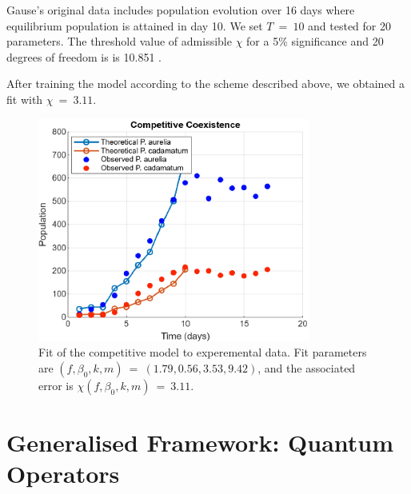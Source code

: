 \documentclass[11pt,reqno]{amsart}
\numberwithin{equation}{section}
\theoremstyle{plain}
\begin{document}
\vspace{2mm}

Gause's original data includes population evolution over 16 days where equilibrium population is attained in day 10. We set $T \ = \  10$ and tested for 20 parameters. The threshold value of admissible $\chi$ for a 5\% significance and 20 degrees of freedom is 
is 10.851 \cite{NIS22}.

After training the model according to the scheme described above, we obtained a fit with $\chi \ = \  3.11$. 

\begin{figure}[htp]
    \centering
    \includegraphics[width=0.8\textwidth]{compCoe_Fit.eps} %
    \caption{Fit of the competitive model to experemental data. Fit parameters are $(f, \beta_0, k, m) \ = \ (1.79, 0.56, 3.53, 9.42
)$, and the associated error is $\chi(f, \beta_0, k, m) \ = \ 3.11$. }
    \label{fig:example}
\end{figure}

\section{Generalised Framework: Quantum Operators}
\end{document}
